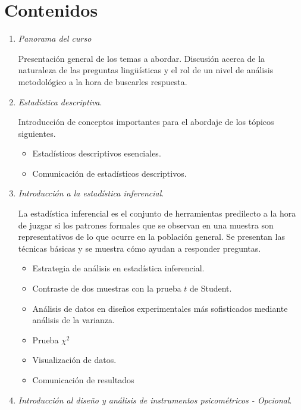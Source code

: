 \documentclass[letterpaper,11pt]{article}
\begin{document}
\section{Contenidos}

\begin{enumerate}
  \item \emph{Panorama del curso}
  
  Presentación general de los temas a abordar. Discusión acerca de la naturaleza de las preguntas lingüísticas y el rol de un nivel de análisis metodológico a la hora de buscarles respuesta. 
  
  \item \emph{Estadística descriptiva}.\label{it:desc}
  
 Introducción de conceptos importantes para el abordaje de los tópicos siguientes.
  
  \begin{itemize}
    \item Estadísticos descriptivos esenciales.
    \item Comunicación de estadísticos descriptivos.
  \end{itemize}

  \item \emph{Introducción a la estadística inferencial}.\label{it:inf}
  
La estadística inferencial es el conjunto de herramientas predilecto a la hora de juzgar si los patrones formales que se observan en una muestra son representativos de lo que ocurre en la población general. Se presentan las técnicas básicas y se muestra cómo ayudan a responder preguntas.

  \begin{itemize}
    \item Estrategia de análisis en estadística inferencial.
    \item Contraste de dos muestras con la prueba $t$ de Student.
    \item Análisis de datos en diseños experimentales más sofisticados mediante análisis de la varianza.
    \item Prueba $\chi^2$
    \item Visualización de datos.
    \item Comunicación de resultados
  \end{itemize}
  
  \item \emph{Introducción al diseño y análisis de instrumentos psicométricos - Opcional}.\label{it:psic}
  

\end{enumerate}
\end{document}
